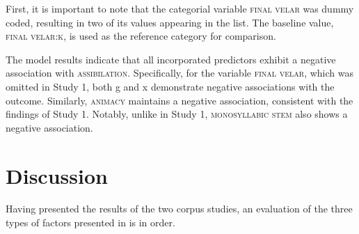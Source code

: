 \documentclass[output=paper,colorlinks,citecolor=brown]{langscibook}
\begin{document}


First, it is important to note that the categorial variable \textsc{final velar} was dummy coded, resulting in two of its values appearing in the list. The baseline value, \textsc{final velar:k}, is used as the reference category for comparison.

The model results indicate that all incorporated predictors exhibit a negative association with \textsc{assibilation}. Specifically, for the variable \textsc{final velar}, which was omitted in Study 1, both \textsf{g} and \textsf{x} demonstrate negative associations with the outcome. Similarly, \textsc{animacy} maintains a negative association, consistent with the findings of Study 1. Notably, unlike in Study 1, \textsc{monosyllabic stem} also shows a negative association.

\section{Discussion}
\label{sim:sec:discussion}

Having presented the results of the two corpus studies, an evaluation of the three types of factors presented in  is in order. 
\end{document}
